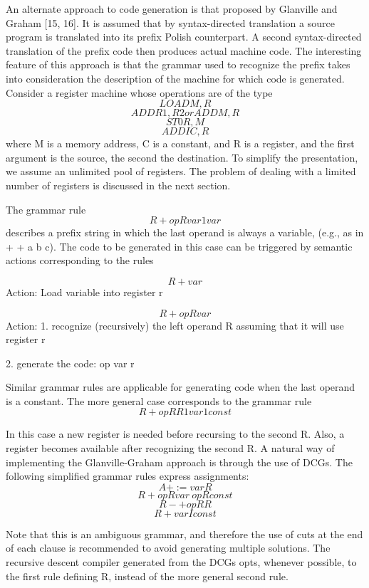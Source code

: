 
An alternate approach to code generation is that proposed by Glanville and
Graham [15, 16]. It is assumed that by syntax-directed translation a source
program is translated into its prefix Polish counterpart. A second syntax-directed
translation of the prefix code then produces actual machine code. The interesting
feature of this approach is that the grammar used to recognize the prefix takes
into consideration the description of the machine for which code is generated.
Consider a register machine whose operations are of the type
\[LOAD M, R\]
\[ADD R1, R2 or ADD M, R\]
\[ST0 R, M\]
\[ADDI C, R\]
where M is a memory address, C is a constant, and R is a register, and the first
argument is the source, the second the destination. To simplify the presentation,
we assume an unlimited pool of registers. The problem of dealing with a limited
number of registers is discussed in the next section.

The grammar rule
\[R + op R var 1 var\]
describes a prefix string in which the last operand is always a variable, (e.g., as
in + + a b c). The code to be generated in this case can be triggered by semantic
actions corresponding to the rules 

\[R + var\]
Action: Load variable into register r

\[R + op R var\]
Action: 1. recognize (recursively) the left operand R assuming that it will
use register r

2. generate the code: op var r

Similar grammar rules are applicable for generating code when the last operand
is a constant. The more general case corresponds to the grammar rule
\[R + op R R 1 var 1 const\]

In this case a new register is needed before recursing to the second R. Also, a
register becomes available after recognizing the second R. A natural way of
implementing the Glanville-Graham approach is through the use of DCGs. The
following simplified grammar rules express assignments:
\[A + := var R\]
\[R+opRvar~opRconst\]
\[R-+opRR\]
\[R + var I const\]

Note that this is an ambiguous grammar, and therefore the use of cuts at the end
of each clause is recommended to avoid generating multiple solutions. The
recursive descent compiler generated from the DCGs opts, whenever possible, to
the first rule defining R, instead of the more general second rule. 

